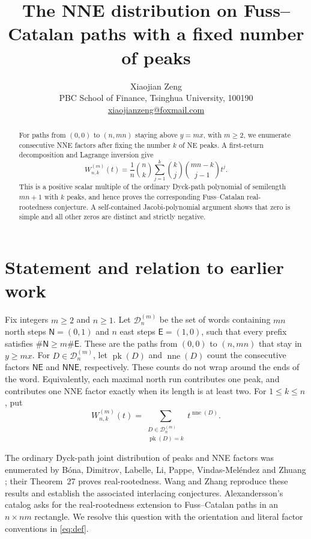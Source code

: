 \documentclass[11pt]{article}
\title{The NNE distribution on Fuss--Catalan paths with a fixed number of peaks}
\author{Xiaojian Zeng\\[3pt]
\small PBC School of Finance, Tsinghua University, 100190\\
\small \href{mailto:xiaojianzeng@foxmail.com}{xiaojianzeng@foxmail.com}}
\date{}
\DeclareMathOperator{\pk}{pk}
\DeclareMathOperator{\nne}{nne}
\newcommand{\N}{\mathsf{N}}
\newcommand{\E}{\mathsf{E}}
\newcommand{\W}{W^{(m)}_{n,k}}
\begin{document}
\maketitle
\begin{abstract}
For paths from $(0,0)$ to $(n,mn)$ staying above $y=mx$, with $m\geq2$,
we enumerate consecutive NNE factors after fixing the number $k$ of NE
peaks. A first-return decomposition and Lagrange inversion give
\[
 W^{(m)}_{n,k}(t)=\frac{1}{n}\binom nk
       \sum_{j=1}^{k}\binom kj\binom{mn-k}{j-1}t^j.
\]
This is a positive scalar multiple of the ordinary Dyck-path polynomial
of semilength $mn+1$ with $k$ peaks, and hence proves the corresponding
Fuss--Catalan real-rootedness conjecture. A self-contained Jacobi-polynomial
argument shows that zero is simple and all other zeros are distinct and
strictly negative.
\end{abstract}

\section{Statement and relation to earlier work}

Fix integers $m\geq2$ and $n\geq1$. Let $\mathcal D^{(m)}_n$ be the
set of words containing $mn$ north steps $\N=(0,1)$ and $n$ east steps
$\E=(1,0)$, such that every prefix satisfies
$\#\N\geq m\#\E$. These are the paths from $(0,0)$ to $(n,mn)$
that stay in $y\geq mx$. For $D\in\mathcal D^{(m)}_n$, let $\pk(D)$
and $\nne(D)$ count the consecutive factors $\N\E$ and $\N\N\E$,
respectively. These counts do not wrap around the ends of the word.
Equivalently, each maximal north run contributes one peak, and contributes
one NNE factor exactly when its length is at least two. For $1\leq k\leq n$,
put
\begin{equation}\label{eq:def}
 \W(t)=\sum_{\substack{D\in\mathcal D^{(m)}_n\\\pk(D)=k}}t^{\nne(D)}.
\end{equation}

The ordinary Dyck-path joint distribution of peaks and NNE factors was
enumerated by B\'ona, Dimitrov, Labelle, Li, Pappe, Vindas-Mel\'endez and
Zhuang \cite[Theorem~2]{BonaEtAl2025}; their Theorem~27 proves
real-rootedness. Wang and Zhang \cite{WangZhang2024} reproduce these
results and establish the associated interlacing conjectures.
Alexandersson's catalog \cite{AlexanderssonCatalan} asks for the
real-rootedness extension to Fuss--Catalan paths in an $n\times nm$
rectangle. We resolve this question with the orientation and literal
factor conventions in \eqref{eq:def}.
\end{document}
